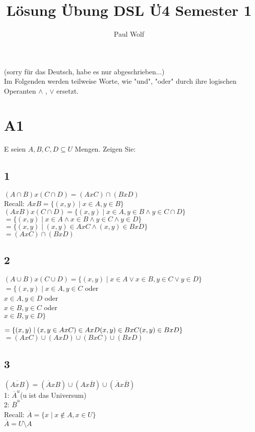 \documentclass[11pt]{scrartcl}
\title{Lösung Übung DSL Ü4 Semester 1}
\author{Paul Wolf}
\begin{document}
\maketitle
\tableofcontents
\section*{}
(sorry für das Deutsch, habe es nur abgeschrieben...) \\
Im Folgenden werden teilweise Worte, wie "und", "oder" durch ihre logischen Operanten $\land$ , $\lor$ ersetzt.

\section{A1}
E seien $A,B,C,D \subseteq U$ Mengen. Zeigen Sie: \\
\subsection{1}
$(A \cap B )x(C \cap D) = (AxC) \cap (BxD)$ \\
Recall: $AxB = \{(x,y) \mid x \in A, y \in B\}$ \\
$(AxB)x(C \cap D) = \{(x,y)\mid x \in A, y \in B \land y \in C \cap D\}$\\
$= \{(x,y)\mid x \in A \land x \in B \land y \in C \land y \in D\}$\\
$= \{(x,y)\mid (x,y) \in AxC \land (x,y) \in BxD \}$\\
$= (AxC) \cap(BxD)$

\subsection{2}
$(A \cup B)x(C \cup D) = \{(x,y) \mid x \in A \lor x \in B, y \in C \lor y \in D \}$ \\
$= \{(x,y) \mid x \in A, y \in C $ oder \\
$x \in A, y \in D $ oder \\
$x \in B, y \in C $ oder \\
$x \in B,y \in D \}$

$= \{(x,y) \mid (x,y \in AxC) \in AxD \\
(x,y) \in BxC \\
(x,y) \in BxD \}$ \\
$= (AxC) \cup (AxD) \cup (BxC) \cup (BxD)$

\subsection{3}
$(\overline{AxB})=(\overline{A} xB) \cup (Ax \overline{B}) \cup (\overline{A} x \overline{B})$ \\
1: $\overline{A}^u$(u ist das Universum) \\
2: $\overline{B}^u$ \\
Recall: $\overline{A} = \{ x \mid x \notin A, x \in U \}$ \\
$\overline{A} = U \setminus A$
\end{document}
